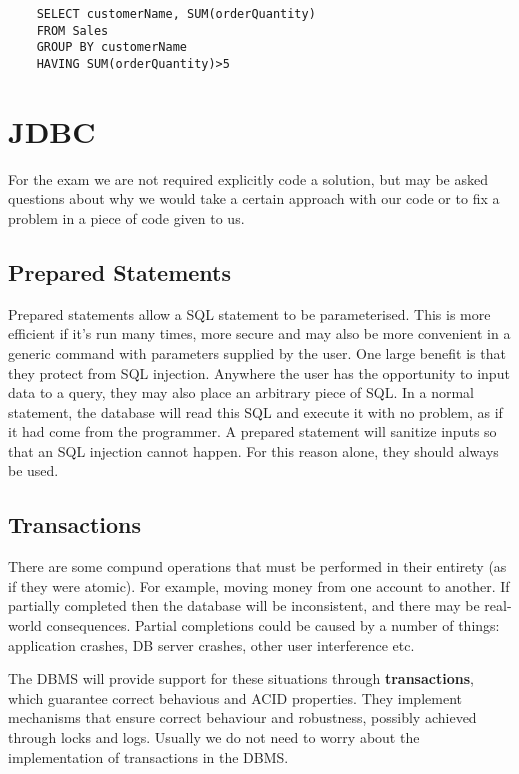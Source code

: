 \documentclass{article}
\begin{document}
	\begin{verbatim}
	SELECT customerName, SUM(orderQuantity)
	FROM Sales
	GROUP BY customerName
	HAVING SUM(orderQuantity)>5
	\end{verbatim}
	
	\section{JDBC}
	For the exam we are not required explicitly code a solution, but may be asked questions about why we would take a certain approach with our code or to fix a problem in a piece of code given to us.
	
	\subsection{Prepared Statements}
	Prepared statements allow a SQL statement to be parameterised. This is more efficient if it's run many times, more secure and may also be more convenient in a generic command with parameters supplied by the user. One large benefit is that they protect from SQL injection. Anywhere the user has the opportunity to input data to a query, they may also place an arbitrary piece of SQL. In a normal statement, the database will read this SQL and execute it with no problem, as if it had come from the programmer. A prepared statement will sanitize inputs so that an SQL injection cannot happen. For this reason alone, they should always be used. 
	
	\subsection{Transactions}
	There are some compund operations that must be performed in their entirety (as if they were atomic). For example, moving money from one account to another. If partially completed then the database will be inconsistent, and there may be real-world consequences. Partial completions could be caused by a number of things: application crashes, DB server crashes, other user interference etc.
	
	\par 
	The DBMS will provide support for these situations through \textbf{transactions}, which guarantee correct behavious and ACID properties. They implement mechanisms that ensure correct behaviour and robustness, possibly achieved through locks and logs. Usually we do not need to worry about the implementation of transactions in the DBMS.
	
\end{document}
